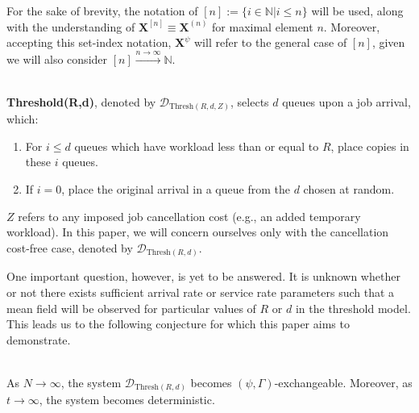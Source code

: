 For the sake of brevity, the notation of $[n] := \{i \in \mathbb{N} | i \leq n\}$ will be used, along with the understanding of $\mathbf{X}^{[n]} \equiv \mathbf{X}^{(n)}$ for maximal element $n$.
Moreover, accepting this set-index notation, $\mathbf{X}^{\psi}$ will refer to the general case of $[n]$, given we will also consider $[n] \overset{n\rightarrow \infty}\longrightarrow \mathbb{N}$.

\begin{definition}[Threshold$(R,d)$]
    \hfill \\
    \textbf{Threshold(R,d)}, denoted by $\mathcal{D}_{\mathrm{Thresh}(R,d,Z)}$, selects $d$ queues upon a job arrival,
    which:
    \begin{enumerate}
        \item For $i \leq d$ queues which have workload less than or equal to $R$, place copies in these $i$ queues.
        \item If $i=0$, place the original arrival in a queue from the $d$ chosen at random.
    \end{enumerate}
    $Z$ refers to any imposed job cancellation cost (e.g., an added temporary workload).
    In this paper, we will concern
    ourselves only with the cancellation cost-free case, denoted by \normalfont $\mathcal{D}_{\text{Thresh}(R,d)}$.
\end{definition}


One important question, however, is yet to be answered.
It is unknown whether or not there exists sufficient arrival rate or service rate parameters such that a mean field will be observed for particular values of $R$ or $d$ in the threshold model.
This leads us to the following conjecture for which this paper aims to demonstrate.
\begin{conjecture}
    \hfill \\
    As $N \longrightarrow \infty$, the system $\mathcal{D}_{\mathrm{Thresh}(R,d)}$ becomes $(\psi, \Gamma)$-exchangeable.
    Moreover, as $t \longrightarrow \infty$, the system becomes deterministic.
    \label{conj}
\end{conjecture}


